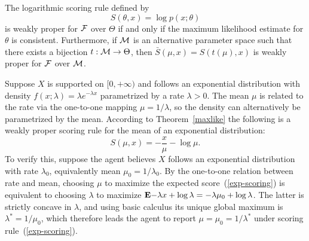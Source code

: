 %
\begin{theorem} \label{maxlike}
The logarithmic scoring rule defined by
%
\[ S(\theta, x) = \log p(x;\theta) \]
%
is weakly proper for $\mathcal{F}$ over $\Theta$ if and only if the maximum likelihood estimate for $\theta$ is consistent. Furthermore, if $\mathcal{M}$ is an alternative parameter space such that there exists a bijection $t : \mathcal{M} \rightarrow \Theta$, then $\bar{S}(\mu, x) = S(t(\mu), x)$ is weakly proper for $\mathcal{F}$ over $\mathcal{M}$. 
\end{theorem}
%

%
\begin{example}
Suppose $X$ is supported on $[0,+\infty)$ and follows an exponential distribution with density $f(x;\lambda) = \lambda e^{-\lambda x}$ parametrized by a rate $\lambda > 0$. The mean $\mu$ is related to the rate via the one-to-one mapping $\mu = 1/\lambda$, so the density can alternatively be parametrized by the mean. According to Theorem~\ref{maxlike} the following is a weakly proper scoring rule for the mean of an exponential distribution:
%
\begin{equation} \label{exp-scoring}
S(\mu, x) = -\frac{x}{\mu} - \log \mu.
\end{equation}
%
To verify this, suppose the agent believes $X$ follows an exponential distribution with rate $\lambda_0$, equivalently mean $\mu_0 = 1/\lambda_0$. By the one-to-one relation between rate and mean, choosing $\mu$ to maximize the expected score~(\ref{exp-scoring}) is equivalent to choosing $\lambda$ to maximize $\mathbf{E}{-\lambda x + \log \lambda} = -\lambda \mu_0 + \log \lambda$. The latter is strictly concave in $\lambda$, and using basic calculus its unique global maximum is $\lambda^* = 1/\mu_0$, which therefore leads the agent to report $\mu = \mu_0 = 1/\lambda^*$ under scoring rule~(\ref{exp-scoring}). 
\end{example}
%

